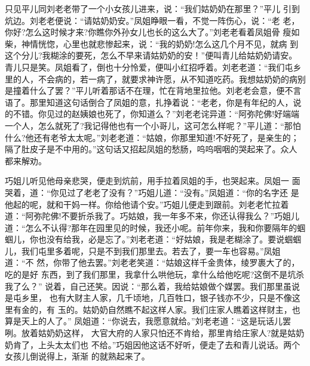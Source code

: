 只见平儿同刘老老带了一个小女孩儿进来，说：“我们姑奶奶在那里？”平儿
引到炕边。刘老老便说：“请姑奶奶安。”凤姐睁眼一看，不觉一阵伤心，说：“老
老，你好?怎么这时候才来?你瞧你外孙女儿也长的这么大了。”刘老老看着凤姐骨
瘦如柴，神情恍惚，心里也就悲惨起来，说：“我的奶奶!怎么这几个月不见，就病
到这个分儿?我糊涂的要死，怎么不早来请姑奶奶的安！”便叫青儿给姑奶奶请安。
青儿只是笑。凤姐看了，倒也十分怜爱，便叫小红招呼着。刘老老道：“我们屯乡
里的人，不会病的，若一病了，就要求神许愿，从不知道吃药。我想姑奶奶的病别
是撞着什么了罢？”平儿听着那话不在理，忙在背地里拉他。刘老老会意，便不言
语了。那里知道这句话倒合了凤姐的意，扎挣着说：“老老，你是有年纪的人，说
的不错。你见过的赵姨娘也死了，你知道么？”刘老老诧异道：“阿弥陀佛!好端端
一个人，怎么就死了?我记得他也有一个小哥儿，这可怎么样呢？”平儿道：“那怕
什么?他还有老爷太太呢。”刘老老道：“姑娘，你那里知道!不好死了，是亲生的；
隔了肚皮子是不中用的。”这句话又招起凤姐的愁肠，呜呜咽咽的哭起来了。众人
都来解劝。

巧姐儿听见他母亲悲哭，便走到炕前，用手拉着凤姐的手，也哭起来。凤姐一
面哭着，道：“你见过了老老了没有？”巧姐儿道：“没有。”凤姐道：“你的名字还
是他起的呢，就和干妈一样。你给他请个安。”巧姐儿便走到跟前。刘老老忙拉着
道：“阿弥陀佛!不要折杀我了。巧姑娘，我一年多不来，你还认得我么？”巧姐儿
道：“怎么不认得?那年在园里见的时候，我还小呢。前年你来，我和你要隔年的蝈
蝈儿，你也没有给我，必是忘了。”刘老老道：“好姑娘，我是老糊涂了。要说蝈蝈
儿，我们屯里多着呢，只是不到我们那里去。若去了，要一车也容易。”凤姐道：“不
然，你带了他去罢。”刘老老笑道：“姑娘这样千金贵体，绫罗裹大了的，吃的是好
东西，到了我们那里，我拿什么哄他玩，拿什么给他吃呢?这倒不是坑杀我了么？”
说着，自己还笑。因说：“那么着，我给姑娘做个媒罢。我们那里虽说是屯乡里，
也有大财主人家，几千顷地，几百牲口，银子钱亦不少，只是不像这里有金的，有
玉的。姑奶奶自然瞧不起这样人家。我们庄家人瞧着这样财主，也算是天上的人了。”
凤姐道：“你说去，我愿意就给。”刘老老道：“这是玩话儿罢咧。放着姑奶奶这样，
大官大府的人家只怕还不肯给，那里肯给庄家人?就是姑奶奶肯了，上头太太们也
不给。”巧姐因他这话不好听，便走了去和青儿说话。两个女孩儿倒说得上，渐渐
的就熟起来了。

